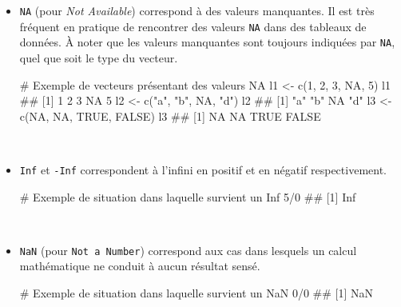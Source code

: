 \documentclass[12pt,twosided, notitlepage]{book}
\newenvironment{Shaded}{}{}
\newcommand{\CommentTok}[1]{\textcolor[rgb]{0.00,0.50,0.00}{#1}}
\newcommand{\DecValTok}[1]{#1}
\newcommand{\KeywordTok}[1]{\textcolor[rgb]{0.00,0.00,1.00}{#1}}
\newcommand{\NormalTok}[1]{#1}
\newcommand{\OperatorTok}[1]{#1}
\newcommand{\OtherTok}[1]{\textcolor[rgb]{1.00,0.25,0.00}{#1}}
\newcommand{\StringTok}[1]{\textcolor[rgb]{0.00,0.50,0.50}{#1}}
\renewenvironment{Shaded}{\begin{snugshade}}{\end{snugshade}}
\begin{document}
\begin{itemize}
\item
  \texttt{NA} (pour \emph{Not Available}) correspond à des valeurs
  manquantes. Il est très fréquent en pratique de rencontrer des valeurs
  \texttt{NA} dans des tableaux de données. À noter que les valeurs
  manquantes sont toujours indiquées par \texttt{NA}, quel que soit le
  type du vecteur.

\begin{Shaded}
\begin{Highlighting}[]
\CommentTok{# Exemple de vecteurs présentant des valeurs NA}
\NormalTok{l1 <-}\StringTok{ }\KeywordTok{c}\NormalTok{(}\DecValTok{1}\NormalTok{, }\DecValTok{2}\NormalTok{, }\DecValTok{3}\NormalTok{, }\OtherTok{NA}\NormalTok{, }\DecValTok{5}\NormalTok{)}
\NormalTok{l1}
\NormalTok{  ## [1]  1  2  3 NA  5}
\NormalTok{l2 <-}\StringTok{ }\KeywordTok{c}\NormalTok{(}\StringTok{"a"}\NormalTok{, }\StringTok{"b"}\NormalTok{, }\OtherTok{NA}\NormalTok{, }\StringTok{"d"}\NormalTok{)}
\NormalTok{l2}
\NormalTok{  ## [1] "a" "b" NA  "d"}
\NormalTok{l3 <-}\StringTok{ }\KeywordTok{c}\NormalTok{(}\OtherTok{NA}\NormalTok{, }\OtherTok{NA}\NormalTok{, }\OtherTok{TRUE}\NormalTok{, }\OtherTok{FALSE}\NormalTok{)}
\NormalTok{l3}
\NormalTok{  ## [1]    NA    NA  TRUE FALSE}
\end{Highlighting}
\end{Shaded}
\end{itemize}

~

\begin{itemize}
\item
  \texttt{Inf} et \texttt{-Inf} correspondent à l'infini en positif et
  en négatif respectivement.

\begin{Shaded}
\begin{Highlighting}[]
\CommentTok{# Exemple de situation dans laquelle survient un Inf}
\DecValTok{5}\OperatorTok{/}\DecValTok{0}
\NormalTok{  ## [1] Inf}
\end{Highlighting}
\end{Shaded}
\end{itemize}

~

\begin{itemize}
\item
  \texttt{NaN} (pour \texttt{Not\ a\ Number}) correspond aux cas dans
  lesquels un calcul mathématique ne conduit à aucun résultat sensé.

\begin{Shaded}
\begin{Highlighting}[]
\CommentTok{# Exemple de situation dans laquelle survient un NaN}
\DecValTok{0}\OperatorTok{/}\DecValTok{0}
\NormalTok{  ## [1] NaN}
\end{Highlighting}
\end{Shaded}
\end{itemize}
\end{document}
